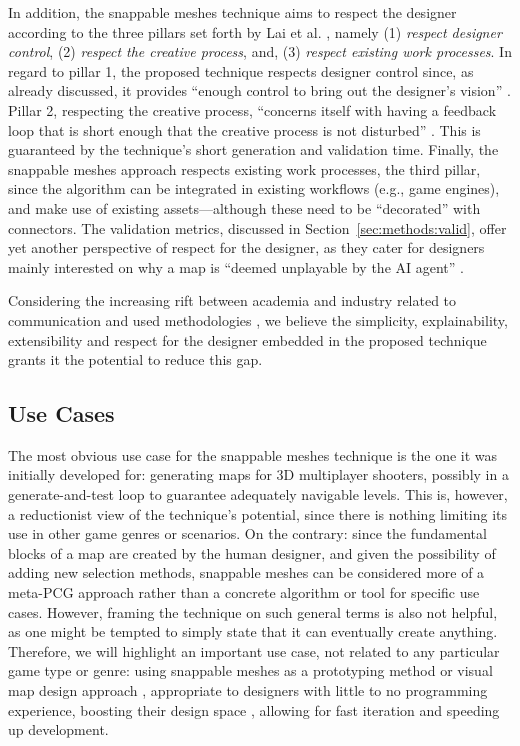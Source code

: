 \documentclass[journal]{IEEEtran}
\begin{document}
In addition, the snappable meshes technique aims to respect the designer according to the
three pillars set forth by Lai et al. \cite{lai2020towards}, namely (1) \textit{respect
designer control}, (2) \textit{respect the creative process}, and, (3) \textit{respect
existing work processes}. In regard to pillar 1, the proposed technique respects designer
control since, as already discussed, it provides ``enough control to bring out the designer's
vision'' \cite{lai2020towards}. Pillar 2, respecting the creative process, ``concerns itself
with having a feedback loop that is short enough that the creative process is not disturbed''
\cite{lai2020towards}. This is guaranteed by the technique's short generation and validation
time. Finally, the snappable meshes approach respects existing work processes, the third pillar,
since the algorithm can be integrated in existing workflows (e.g., game engines), and make use
of existing assets---although these need to be ``decorated'' with connectors. The validation
metrics, discussed in Section~\ref{sec:methods:valid}, offer yet another perspective of
respect for the designer, as they cater for designers mainly interested on why a map is ``deemed
unplayable by the AI agent'' \cite{zhu2018explainable}.

Considering the increasing rift between
academia and industry related to communication and used methodologies \cite{lai2020towards},
we believe the simplicity, explainability, extensibility and respect for the designer embedded
in the proposed technique grants it the potential to reduce this gap.

\subsection{Use Cases}
\label{sec:discussion:uses}

The most obvious use case for the snappable meshes technique is the one it was
initially developed for: generating maps for 3D multiplayer shooters, possibly in a
generate-and-test loop to guarantee adequately navigable levels. This is, however,
a reductionist view of the technique's potential, since there is nothing limiting
its use in other game genres or scenarios. On the contrary: since the fundamental
blocks of a map are created by the human designer, and given the possibility of
adding new selection methods, snappable meshes can be considered more of a meta-PCG
approach rather than a concrete algorithm or tool for specific use cases. However,
framing the technique on such general terms is also not helpful, as one might be
tempted to simply state that it can eventually create anything. Therefore, we
will highlight an important use case, not related to any particular game type or
genre: using snappable meshes as a prototyping method or visual map design approach
\cite{almeida2013systematic}, appropriate to designers with little to no programming
experience, boosting their design space \cite{noor2016evaluating}, allowing for fast
iteration and speeding up development.
\end{document}
